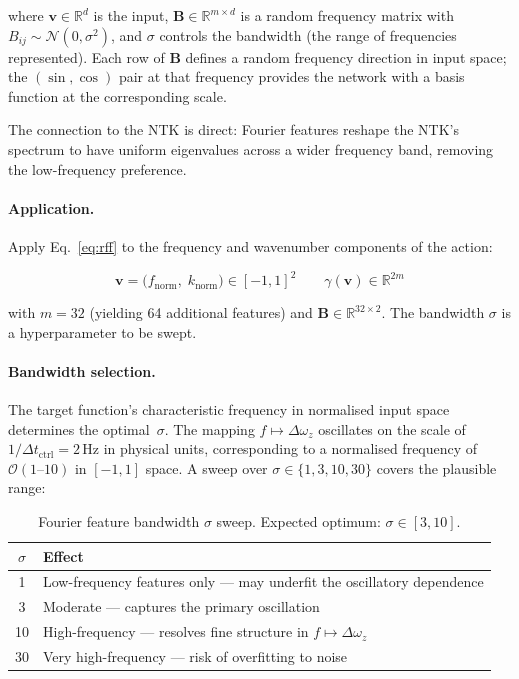 \documentclass[11pt]{article}
\newcommand{\vect}[1]{\mathbf{#1}}
\newcommand{\mat}[1]{\mathbf{#1}}
\newcommand{\Real}{\mathbb{R}}
\begin{document}
\noindent
where $\vect{v} \in \Real^d$ is the input,
$\mat{B} \in \Real^{m \times d}$ is a random frequency matrix with
$B_{ij} \sim \mathcal{N}(0, \sigma^2)$, and
$\sigma$ controls the bandwidth (the range of frequencies represented).
Each row of $\mat{B}$ defines a random frequency direction in input space;
the $(\sin, \cos)$ pair at that frequency provides the network with a basis
function at the corresponding scale.

The connection to the NTK is direct: Fourier features reshape the NTK's spectrum
to have uniform eigenvalues across a wider frequency band, removing the
low-frequency preference.

\paragraph{Application.}
Apply Eq.~\ref{eq:rff} to the frequency and wavenumber components of the action:

\begin{equation}
  \vect{v} = \bigl(f_{\mathrm{norm}},\; k_{\mathrm{norm}}\bigr) \in [-1, 1]^2
  \qquad
  \gamma(\vect{v}) \in \Real^{2m}
  \label{eq:rff-fk}
\end{equation}

\noindent
with $m = 32$ (yielding 64 additional features) and $\mat{B} \in \Real^{32 \times 2}$.
The bandwidth $\sigma$ is a hyperparameter to be swept.

\paragraph{Bandwidth selection.}
The target function's characteristic frequency in normalised input space determines
the optimal~$\sigma$.
The mapping $f \mapsto \Delta\omega_z$ oscillates on the scale of
$1 / \Delta t_{\mathrm{ctrl}} = 2$\,Hz in physical units, corresponding to a
normalised frequency of $\mathcal{O}(1\text{--}10)$ in $[-1, 1]$ space.
A sweep over $\sigma \in \{1, 3, 10, 30\}$ covers the plausible range:

\begin{table}[H]
  \centering
  \renewcommand{\arraystretch}{1.2}
  \begin{tabular}{cl}
    \toprule
    $\sigma$ & Effect \\
    \midrule
    1   & Low-frequency features only --- may underfit the oscillatory dependence \\
    3   & Moderate --- captures the primary oscillation \\
    10  & High-frequency --- resolves fine structure in $f \mapsto \Delta\omega_z$ \\
    30  & Very high-frequency --- risk of overfitting to noise \\
    \bottomrule
  \end{tabular}
  \caption{Fourier feature bandwidth $\sigma$ sweep.
    Expected optimum: $\sigma \in [3, 10]$.}
  \label{tab:sigma-sweep}
\end{table}
\end{document}
